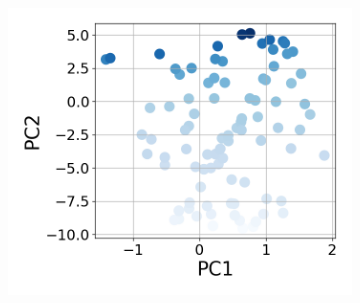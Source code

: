 \documentclass{article} %
\begin{document}
\begin{figure}[t]
\begin{subfigure}{0.182\textwidth}
    \includegraphics[width=\linewidth]{images/model-tsne-components-entropy.png}
    \caption{}
\end{subfigure}\hfill
\begin{subfigure}{0.08\textwidth}
\end{subfigure}


\end{figure}
\end{document}
